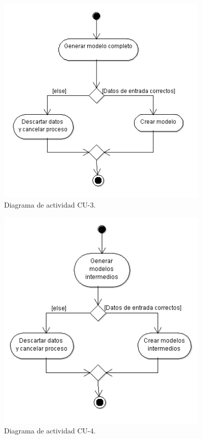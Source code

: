 \begin{figure}[H]
\centering
\includegraphics[width=0.9\textwidth]{imagenes/diagramas/DA1.png}
\caption{Diagrama de actividad CU-3.}
\end{figure}

\begin{figure}[H]
\centering
\includegraphics[width=0.9\textwidth]{imagenes/diagramas/DA2.png}
\caption{Diagrama de actividad CU-4.}
\end{figure}

